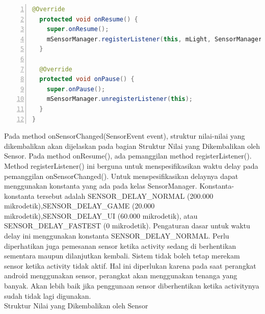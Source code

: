 \documentclass[a4paper,twoside]{article}
\begin{document}
\begin{enumerate}
\begin{lstlisting}[language=java,numbers=left,breaklines=true,caption={Contoh memonitor data mentah pada sensor cahaya},label={lst:monitoring-light-sensor},language=java]
  @Override
  protected void onResume() {
    super.onResume();
    mSensorManager.registerListener(this, mLight, SensorManager.SENSOR_DELAY_NORMAL);
  }

  @Override
  protected void onPause() {
    super.onPause();
    mSensorManager.unregisterListener(this);
  }
}
\end{lstlisting}
Pada method onSensorChanged(SensorEvent event), struktur nilai-nilai yang dikembalikan akan dijelaskan pada bagian Struktur Nilai yang Dikembalikan oleh Sensor. Pada method onResume(), ada pemanggilan method registerListener(). Method registerListener() ini berguna untuk menspesifikasikan waktu delay pada pemanggilan onSensorChanged(). Untuk menspesifikasikan delaynya dapat menggunakan konstanta yang ada pada kelas SensorManager. Konstanta-konstanta tersebut adalah SENSOR\_DELAY\_NORMAL (200.000 mikrodetik),SENSOR\_DELAY\_GAME (20.000 mikrodetik),SENSOR\_DELAY\_UI (60.000 mikrodetik), atau SENSOR\_DELAY\_FASTEST (0 mikrodetik). Pengaturan dasar untuk waktu delay ini menggunakan konstanta SENSOR\_DELAY\_NORMAL.
Perlu diperhatikan juga pemesanan sensor ketika activity sedang di berhentikan sementara maupun dilanjutkan kembali. Sistem tidak boleh tetap merekam sensor ketika activity tidak aktif. Hal ini diperlukan karena pada saat perangkat android menggunakan sensor, perangkat akan menggunakan tenanga yang banyak. Akan lebih baik jika penggunaan sensor diberhentikan ketika activitynya sudah tidak lagi digunakan. \\

Struktur Nilai yang Dikembalikan oleh Sensor\\


\end{enumerate}
\end{document}
